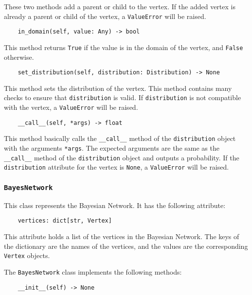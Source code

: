 \documentclass{article}
\theoremstyle{definition}
\begin{document}
These two methods add a parent or child to the vertex. If the added vertex is already a parent or child of the vertex, a \texttt{ValueError} will be raised.

\begin{verbatim}
    in_domain(self, value: Any) -> bool
\end{verbatim}

This method returns \texttt{True} if the value is in the domain of the vertex, and \texttt{False} otherwise.

\begin{verbatim}
    set_distribution(self, distribution: Distribution) -> None
\end{verbatim}

This method sets the distribution of the vertex. This method contains many checks to ensure that \texttt{distribution} is valid. If \texttt{distribution} is not compatible with the vertex, a \texttt{ValueError} will be raised.

\begin{verbatim}
    __call__(self, *args) -> float
\end{verbatim}

This method basically calls the \texttt{\_\_call\_\_} method of the \texttt{distribution} object with the arguments \texttt{*args}. The expected arguments are the same as the \texttt{\_\_call\_\_} method of the \texttt{distribution} object and outputs a probability. If the \texttt{distribution} attribute for the vertex is \texttt{None}, a \texttt{ValueError} will be raised.

\subsubsection{\texttt{BayesNetwork}}

This class represents the Bayesian Network. It has the following attribute:

\begin{verbatim}
    vertices: dict[str, Vertex]
\end{verbatim}

This attribute holds a list of the vertices in the Bayesian Network. The keys of the dictionary are the names of the vertices, and the values are the corresponding \texttt{Vertex} objects.

The \texttt{BayesNetwork} class implements the following methods:

\begin{verbatim}
    __init__(self) -> None
\end{verbatim}
\end{document}
